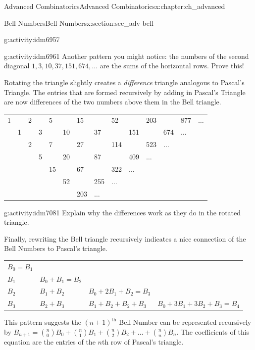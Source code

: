 \documentclass[oneside,10pt,]{book}
\numberwithin{equation}{chapter}
\begin{document}
\begin{chapterptx}{Advanced Combinatorics}{}{Advanced Combinatorics}{}{}{x:chapter:ch_advanced}
\begin{sectionptx}{Bell Numbers}{}{Bell Numbers}{}{}{x:section:sec_adv-bell}
\begin{activity}{}{g:activity:idm6957}
\end{activity}
\begin{activity}{}{g:activity:idm6961}%
Another pattern you might notice: the numbers of the second diagonal \(1, 3, 10, 37, 151, 674, \ldots\) are the sums of the horizontal rows.  Prove this!%
\end{activity}
Rotating the triangle slightly creates a \emph{difference} triangle analogous to Pascal's Triangle. The entries that are formed recursively by adding in Pascal's Triangle are now differences of the two numbers above them in the Bell triangle.%
\begin{sidebyside}{1}{0}{0}{0}%
\begin{sbspanel}{1}%
{\centering%
\begin{tabular}{llllllllllllll}
1&&2&&5&&15&&52&&203&&877&\(\ldots\)\tabularnewline[0pt]
&1&&3&&10&&37&&151&&674&\(\ldots\)&\tabularnewline[0pt]
&&2&&7&&27&&114&&523&\(\ldots\)&&\tabularnewline[0pt]
&&&5&&20&&87&&409&\(\ldots\)&&&\tabularnewline[0pt]
&&&&15&&67&&322&\(\ldots\)&&&&\tabularnewline[0pt]
&&&&&52&&255&\(\ldots\)&&&&&\tabularnewline[0pt]
&&&&&&203&\(\ldots\)&&&&&&
\end{tabular}
\par}
\end{sbspanel}%
\end{sidebyside}%
\begin{activity}{}{g:activity:idm7081}%
Explain why the differences work as they do in the rotated triangle.%
\end{activity}
Finally, rewriting the Bell triangle recursively indicates a nice connection of the Bell Numbers to Pascal's triangle.%
\begin{sidebyside}{1}{0}{0}{0}%
\begin{sbspanel}{1}%
{\centering%
\begin{tabular}{llll}
\(B_{0} = B_{1}\)&&&\tabularnewline[0pt]
\(B_{1}\)&\(B_{0} + B_{1} = B_{2}\)&&\tabularnewline[0pt]
\(B_{2}\)&\(B_{1} + B_{2}\)&\(B_{0} + 2B_{1} + B_{2} = B_{3}\)&\tabularnewline[0pt]
\(B_{3}\)&\(B_{2} + B_{3}\)&\(B_{1} + B_{2} + B_{2} + B_{3}\)&\(B_{0} + 3B_{1} + 3B_{2} + B_{3} = B_{4}\)
\end{tabular}
\par}
\end{sbspanel}%
\end{sidebyside}%
\par
This pattern suggests the \({(n + 1)}^{\text{th}}\) Bell Number can be represented recursively by \(B_{n + 1} = \binom{n}{0} B_{0} + \binom{n}{1} B_{1} + \binom{n}{2}B_{2} + \ldots + \binom{n}{n} B_{n}\). The coefficients of this equation are the entries of the \(n\)th row of Pascal's triangle.%

\end{sectionptx}
\end{chapterptx}
\end{document}

